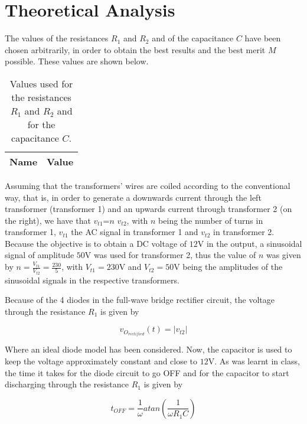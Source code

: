 \section{Theoretical Analysis}

The values of the resistances $R_1$ and $R_2$ and of the capacitance $C$ have been chosen arbitrarily, in order to obtain the best results and the best merit $M$ possible. These values are shown below.

\begin{table}[H]
  \centering
  \begin{tabular}{|c|c|}
    \hline    
    {\bf Name} & {\bf Value} \\ \hline
    
  \end{tabular}
  \caption{Values used for the resistances $R_1$ and $R_2$ and for the capacitance $C$.}
  \label{tab:ChosenValues}
\end{table}

Assuming that the transformers' wires are coiled according to the conventional way, that is, in order to generate a downwards current through the left transformer (transformer 1) and an upwards current through transformer 2 (on the right), we have that $v_{t1}$=$n$ $v_{t2}$, with $n$ being the number of turns in transformer 1, $v_{t1}$ the AC signal in transformer 1 and $v_{t2}$ in transformer 2. Because the objective is to obtain a DC voltage of $12$V in the output, a sinusoidal signal of amplitude $50$V was used for transformer 2, thus the value of $n$ was given by $n=\frac{V_{t1}}{V_{t2}}=\frac{230}{5}$, with $V_{t1}=230$V and $V_{t2}=50$V being the amplitudes of the sinusoidal signals in the respective transformers.
\par
Because of the 4 diodes in the full-wave bridge rectifier circuit, the voltage through the resistance $R_1$ is given by

\begin{equation} \label{eq:rectified_voltage}
  v_{O_{rectified}}(t)=|v_{t2}|
\end{equation}

Where an ideal diode model has been considered. Now, the capacitor is used to keep the voltage approximately constant and close to $12$V. As was learnt in class, the time it takes for the diode circuit to go OFF and for the capacitor to start discharging through the resistance $R_1$ is given by

\begin{equation} \label{eq:toff}
  t_{OFF}=\frac{1}{\omega}atan\left(\frac{1}{\omega R_1C}\right)
\end{equation}

